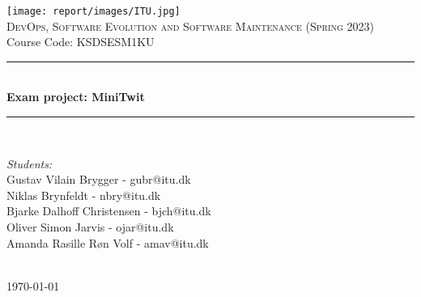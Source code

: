 
\begin{titlepage}

\newcommand{\HRule}{\rule{\linewidth}{0.5mm}} 
\center


\texttt{[image: report/images/ITU.jpg]}\\[3cm]

\textsc{\LARGE DevOps, Software Evolution and Software Maintenance (Spring 2023)}\\[0.5cm] %
Course Code: KSDSESM1KU\\[1cm]


\HRule \\[0.8cm]
{ \huge \bfseries Exam project: MiniTwit }\\[0.4cm] %
\HRule \\[1.5cm]


\begin{minipage}{0.6\textwidth}
    \center
    \emph{Students:}\\
    Gustav Vilain Brygger - gubr@itu.dk \\
    Niklas Brynfeldt - nbry@itu.dk \\
    Bjarke Dalhoff Christensen - bjch@itu.dk \\
    Oliver Simon Jarvis - ojar@itu.dk \\
    Amanda Rasille Røn Volf - amav@itu.dk \\

\end{minipage}\\[2cm]

{\large \today}\\[2cm]

\vfill %

\end{titlepage}